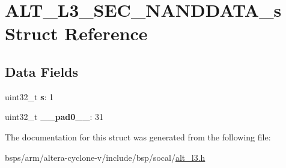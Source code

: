 \hypertarget{structALT__L3__SEC__NANDDATA__s}{}\section{A\+L\+T\+\_\+\+L3\+\_\+\+S\+E\+C\+\_\+\+N\+A\+N\+D\+D\+A\+T\+A\+\_\+s Struct Reference}
\label{structALT__L3__SEC__NANDDATA__s}
\subsection*{Data Fields}
\begin{DoxyCompactItemize}
\item 
\mbox{\label{structALT__L3__SEC__NANDDATA__s_af7b51286f9838c8b6dc68ee1332e144f}} 
uint32\+\_\+t {\bfseries s}\+: 1
\item 
\mbox{\label{structALT__L3__SEC__NANDDATA__s_a705cdc8624d3eaeda4a2172739bfa2d6}} 
uint32\+\_\+t {\bfseries \+\_\+\+\_\+pad0\+\_\+\+\_\+}\+: 31
\end{DoxyCompactItemize}


The documentation for this struct was generated from the following file\+:\begin{DoxyCompactItemize}
\item 
bsps/arm/altera-\/cyclone-\/v/include/bsp/socal/\mbox{\hyperlink{alt__l3_8h}{alt\+\_\+l3.\+h}}\end{DoxyCompactItemize}
